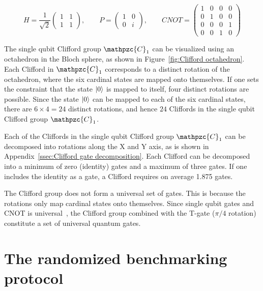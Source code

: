       \begin{equation}
        H =
        \frac{1}{\sqrt{2}}
        \begin{pmatrix}
          1 & 1 \\
          1 & 1
        \end{pmatrix}, \qquad
        P =
        \begin{pmatrix}
          1 & 0 \\
          0 & i
        \end{pmatrix}, \qquad
        CNOT =
        \begin{pmatrix}
          1 & 0 & 0 & 0 \\
          0 & 1 & 0 & 0 \\
          0 & 0 & 0 & 1 \\
          0 & 0 & 1 & 0
        \end{pmatrix}
      \end{equation}

      The single qubit Clifford group $\mathpzc{C}_1$ can be visualized using an octahedron in the Bloch sphere, as shown in Figure~\ref{fig:Clifford octahedron}. Each Clifford in $\mathpzc{C}_1$ corresponds to a distinct rotation of the octahedron, where the six cardinal states are mapped onto themselves. If one sets the constraint that the state $\ket{0}$ is mapped to itself, four distinct rotations are possible. Since the state $\ket{0}$ can be mapped to each of the six cardinal states, there are $6 \times 4=24$ distinct rotations, and hence $24$ Cliffords in the single qubit Clifford group $\mathpzc{C}_1$.

      Each of the Cliffords in the single qubit Clifford group $\mathpzc{C}_1$ can be decomposed into rotations along the X and Y axis, as is shown in Appendix~\ref{ssec:Clifford gate decomposition}. Each Clifford can be decomposed into a minimum of zero (identity) gates and a maximum of three gates. If one includes the identity as a gate, a Clifford requires on average 1.875 gates.

      The Clifford group does not form a universal set of gates. This is because the rotations only map cardinal states onto themselves. Since single qubit gates and CNOT is universal~\cite{nielsen2010quantum}, the Clifford group combined with the T-gate ($\pi/4$ rotation) constitute a set of universal quantum gates.

    \section{The randomized benchmarking protocol}
      \label{sec:randomized benchmarking protocol}

